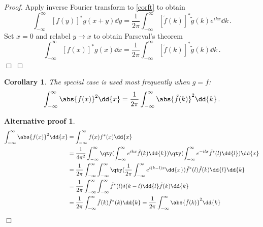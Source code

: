 \documentclass{article}
\theoremstyle{plain}\theoremheaderfont{\normalfont\itshape}\theorembodyfont{\rmfamily}\theoremseparator{.}\newtheorem*{rem}{Remark}\newtheorem*{ex}{Example}\newtheorem*{proof}{Proof}\newtheorem*{altp}{Alternative proof}
\theoremstyle{plain}\theoremheaderfont{\normalfont\bfseries}\theorembodyfont{\rmfamily}\theoremseparator{.}\newtheorem{thm}{Theorem}[section]\newtheorem{lem}[thm]{Lemma}\newtheorem{prop}[thm]{Proposition}\newtheorem*{cor}{Corollary}\newtheorem{defn}[thm]{Definition}\newtheorem{clm}[thm]{Claim}\newtheorem{clminproof}{Claim}
\theoremstyle{break}\theoremheaderfont{\normalfont\itshape}\theorembodyfont{\rmfamily}\theoremseparator{.\medskip}\newtheorem*{proofskip}{Proof}\newtheorem*{exs}{Examples}\newtheorem*{rems}{Remarks}
\theoremstyle{break}\theoremheaderfont{\normalfont\bfseries}\theorembodyfont{\rmfamily}\theoremseparator{.\medskip}\newtheorem{lemskip}[thm]{Lemma}\newtheorem{defnskip}[thm]{Definition}\newtheorem{propskip}[thm]{Proposition}\newtheorem{thmskip}[thm]{Theorem}
\numberwithin{equation}{section}
\newcommand{\qed}{\hfill\ensuremath{\Box}}
\begin{document}
	\begin{proof}
		Apply inverse Fourier transform to \cref{corft} to obtain
		\[\int_{-\infty}^{\infty}[f(y)]^* g(x+y)\dd{y}=\frac{1}{2\pi}\int_{-\infty}^{\infty}[\tilde{f}(k)]^*\tilde{g}(k)e^{ikx}\dd{k}\,.\]
		Set \(x=0\) and relabel \(y\to x\) to obtain Parseval's theorem
		\[\int_{-\infty}^{\infty}[f(x)]^*g(x)\dd{x}=\frac{1}{2\pi}\int_{-\infty}^{\infty}[\tilde{f}(k)]^*\tilde{g}(k)\dd{k}\,.\]\qed
	\end{proof}
	
	\begin{cor}
		The special case is used most frequently when \(g=f\):
		\[\int_{-\infty}^{\infty}\abs{f(x)}^2\dd{x}=\frac{1}{2\pi}\int_{-\infty}^{\infty}\abs{\tilde{f}(k)}^2\dd{k}\,.\]
	\end{cor}
	
	\begin{altp}
		\begin{align*}
			\int_{-\infty}^{\infty}\abs{f(x)}^2\dd{x}&=\int_{-\infty}^{\infty}f(x)f^*(x)\dd{x}\\
			&=\frac{1}{4\pi^2}\int_{-\infty}^{\infty}\qty(\int_{-\infty}^{\infty}e^{ikx}\tilde{f}(k)\dd{k})\qty(\int_{-\infty}^{\infty}e^{-ilx}\tilde{f}^*(l)\dd{l})\dd{x}\\
			&=\frac{1}{2\pi}\int_{-\infty}^{\infty}\int_{-\infty}^{\infty}\qty(\frac{1}{2\pi}\int_{-\infty}^{\infty}e^{i(k-l)x}\dd{x})\tilde{f}^*(l)\tilde{f}(k)\dd{l}\dd{k}\\
			&=\frac{1}{2\pi}\int_{-\infty}^{\infty}\int_{-\infty}^{\infty}\tilde{f}^*(l)\delta(k-l)\dd{l}\tilde{f}(k)\dd{k}\\
			&=\frac{1}{2\pi}\int_{-\infty}^{\infty}\tilde{f}(k)\tilde{f}^*(k)\dd{k}=\frac{1}{2\pi}\int_{-\infty}^{\infty}\abs{\tilde{f}(k)}^2\dd{k}
		\end{align*}\qed
	\end{altp}
	
\end{document}
